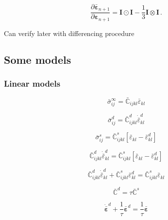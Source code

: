 \documentclass[12pt]{article}
\newcommand{\pder}[2]{\dfrac{\partial #1}{\partial #2}}
\begin{document}
\begin{equation}
	\pder{\bar{\bm{\varepsilon}}_{n+1}}{\bm{\varepsilon}_{n+1}}  = \bm{I} \odot \bm{I} - \dfrac{1}{3}\bm{I} \otimes \bm{I} \,.
\end{equation}

Can verify later with differencing procedure


\subsection{Some models}

\subsubsection{Linear models}
\begin{equation}
	\bar{\sigma}_{ij}^{\infty}= \bar{\mathbb{C}}_{ijkl} \bar{\varepsilon}_{kl}
\end{equation}

\begin{equation}
	\bar{\sigma}_{ij}^{d} = \bar{\mathbb{C}}^{d}_{ijkl} \dot{\bar{\varepsilon}}^{d}_{kl}
\end{equation}

\begin{equation}
\bar{\sigma}_{ij}^{s} = \bar{\mathbb{C}}^{s}_{ijkl} \left[\bar{\varepsilon}_{kl}-\bar{\varepsilon}^{d}_{kl}\right]
\end{equation}

\begin{equation}
	\bar{\mathbb{C}}^{d}_{ijkl} \dot{\bar{\varepsilon}}^{d}_{kl} = \bar{\mathbb{C}}^{s}_{ijkl} \left[\bar{\varepsilon}_{kl}-\bar{\varepsilon}^{d}_{kl}\right]
\end{equation}

\begin{equation}
\bar{\mathbb{C}}^{d}_{ijkl} \dot{\bar{\varepsilon}}^{d}_{kl} + \bar{\mathbb{C}}^{s}_{ijkl}\bar{\varepsilon}^{d}_{kl} = \bar{\mathbb{C}}^{s}_{ijkl} \bar{\varepsilon}_{kl}
\end{equation}

\begin{equation}
	\bar{\mathbb{C}}^{d} = \tau\bar{\mathbb{C}}^{s}
\end{equation}

\begin{equation}
\dot{\bar{\bm{\varepsilon}}}^{d} + \dfrac{1}{\tau}\bar{\bm{\varepsilon}}^{d} = \dfrac{1}{\tau} \bar{\bm{\varepsilon}}
\end{equation}
\end{document}
